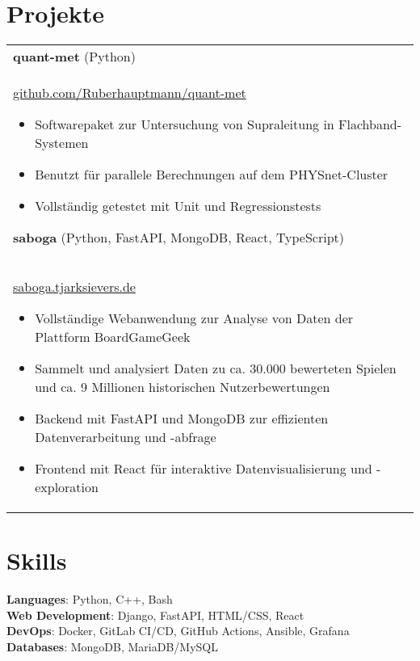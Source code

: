 \documentclass[
    fontsize=11pt,
    a4paper,
]{scrartcl}
\begin{document}
%
%

\section{Projekte}
\noindent
\begin{tabularx}{\textwidth}{@{} X}
    \textbf{quant-met} (Python)     \\ \href{https://github.com/Ruberhauptmann/quant-met}{github.com/Ruberhauptmann/quant-met}          \begin{itemize}
            \item Softwarepaket zur Untersuchung von Supraleitung in Flachband-Systemen
            \item Benutzt für parallele Berechnungen auf dem PHYSnet-Cluster
            \item Vollständig getestet mit Unit und Regressionstests
        \end{itemize}
     \vspace{0.8em}
    \textbf{saboga} (Python, FastAPI, MongoDB, React, TypeScript)     \\ \href{https://saboga.tjarksievers.de}{saboga.tjarksievers.de}          \begin{itemize}
            \item Vollständige Webanwendung zur Analyse von Daten der Plattform BoardGameGeek
            \item Sammelt und analysiert Daten zu ca. 30.000 bewerteten Spielen und ca. 9 Millionen historischen Nutzerbewertungen
            \item Backend mit FastAPI und MongoDB zur effizienten Datenverarbeitung und -abfrage
            \item Frontend mit React für interaktive Datenvisualisierung und -exploration
        \end{itemize}
     \vspace{0.8em}
\end{tabularx}

%
%

\section{Skills}
\noindent
\textbf{Languages}:
Python, C++, Bash\\
\textbf{Web Development}:
Django, FastAPI, HTML/CSS, React\\
\textbf{DevOps}:
Docker, GitLab CI/CD, GitHub Actions, Ansible, Grafana\\
\textbf{Databases}:
MongoDB, MariaDB/MySQL\\
\end{document}
